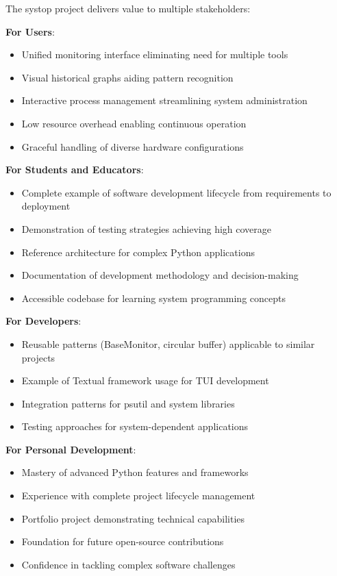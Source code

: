 \documentclass[12pt,a4paper,oneside]{report}
\begin{document}
The systop project delivers value to multiple stakeholders:

\textbf{For Users}: 
\begin{itemize}
    \item Unified monitoring interface eliminating need for multiple tools
    \item Visual historical graphs aiding pattern recognition
    \item Interactive process management streamlining system administration
    \item Low resource overhead enabling continuous operation
    \item Graceful handling of diverse hardware configurations
\end{itemize}

\textbf{For Students and Educators}:
\begin{itemize}
    \item Complete example of software development lifecycle from requirements to deployment
    \item Demonstration of testing strategies achieving high coverage
    \item Reference architecture for complex Python applications
    \item Documentation of development methodology and decision-making
    \item Accessible codebase for learning system programming concepts
\end{itemize}

\textbf{For Developers}:
\begin{itemize}
    \item Reusable patterns (BaseMonitor, circular buffer) applicable to similar projects
    \item Example of Textual framework usage for TUI development
    \item Integration patterns for psutil and system libraries
    \item Testing approaches for system-dependent applications
\end{itemize}

\textbf{For Personal Development}:
\begin{itemize}
    \item Mastery of advanced Python features and frameworks
    \item Experience with complete project lifecycle management
    \item Portfolio project demonstrating technical capabilities
    \item Foundation for future open-source contributions
    \item Confidence in tackling complex software challenges
\end{itemize}
\end{document}
